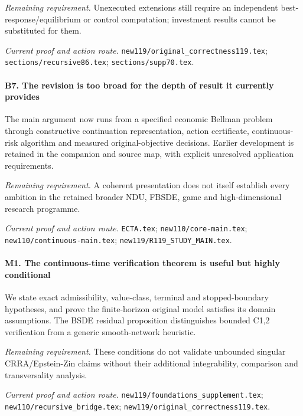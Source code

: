 \par\emph{Remaining requirement.} Unexecuted extensions still require an independent best-response/\allowbreak{}equilibrium or control computation; investment results cannot be substituted for them.

\par\emph{Current proof and action route.} \nolinkurl{new119/original_correctness119.tex}; \nolinkurl{sections/recursive86.tex}; \nolinkurl{sections/supp70.tex}.

\paragraph{B7. The revision is too broad for the depth of result it currently provides}

The main argument now runs from a specified economic Bellman problem through constructive continuation representation, action certificate, continuous-risk algorithm and measured original-objective decisions. Earlier development is retained in the companion and source map, with explicit unresolved application requirements.

\par\emph{Remaining requirement.} A coherent presentation does not itself establish every ambition in the retained broader NDU, FBSDE, game and high-dimensional research programme.

\par\emph{Current proof and action route.} \nolinkurl{ECTA.tex}; \nolinkurl{new110/core-main.tex}; \nolinkurl{new110/continuous-main.tex}; \nolinkurl{new119/R119_STUDY_MAIN.tex}.

\paragraph{M1. The continuous-time verification theorem is useful but highly conditional}

We state exact admissibility, value-class, terminal and stopped-boundary hypotheses, and prove the finite-horizon original model satisfies its domain assumptions. The BSDE residual proposition distinguishes bounded C1,2 verification from a generic smooth-network heuristic.

\par\emph{Remaining requirement.} These conditions do not validate unbounded singular CRRA/\allowbreak{}Epstein-Zin claims without their additional integrability, comparison and transversality analysis.

\par\emph{Current proof and action route.} \nolinkurl{new119/foundations_supplement.tex}; \nolinkurl{new110/recursive_bridge.tex}; \nolinkurl{new119/original_correctness119.tex}.

